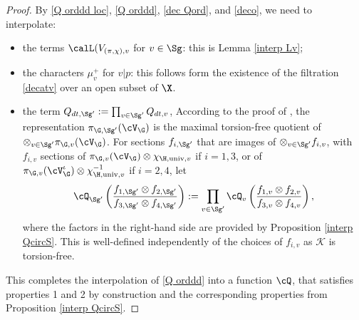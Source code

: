 \begin{proof} By \eqref{Q orddd loc}, \eqref{Q orddd}, \eqref{dec Qord}, and \eqref{deco}, we need to interpolate:
\begin{itemize}
\item the terms $\calL(V_{(\pi, \chi), v}$ for $v\in \Sg$: this is Lemma \ref{interp Lv};
\item the characters $\mu_{v}^{+}$ for $v\vert p$:  this follows form the existence of the filtration  \eqref{decatv} over  an open subset of $\X$.
\item the term $Q_{dt, \Sg'}:=\prod_{v\in \Sg'}Q_{dt, v}$,
 According to the proof of \cite[Theorem 4.4.1]{LLC},
the representation $\pi_{\G, {\Sg'}}(\cV_{\G})$ is the maximal torsion-free quotient of $\otimes_{v\in {\Sg'}}\pi_{\G,v}(\cV_{\G})$.  For  sections $f_{i,{\Sg'}}$ that are  images of $\otimes_{v\in {\Sg'}}f_{i,v}$, with $f_{i,v}$ sections of $ \pi_{\G,v}(\cV_{\G})\otimes\chi_{\H, {\rm univ},v}$ if $i=1,3$, or of  $ \pi_{\G,v}(\cV_{\G}^{\iota})\otimes\chi^{-1}_{\H, {\rm univ},v}$ if $i=2,4$, let
$$\cQ^{}_{{\Sg'}}\left({ f_{1, {\Sg'}}\otimes f_{2, {\Sg'}}\over f_{3, {\Sg'}}\otimes f_{4, {\Sg'}}}\right):=
\prod_{v\in {\Sg'}} \cQ_{v}\left( {f_{1,v}\otimes f_{2,v}\over f_{3,v}\otimes  f_{4,v}}\right),$$
where the factors in the right-hand side are provided by Proposition \ref{interp QcircS}. This is
 well-defined  independently of the choices of $f_{i,v}$ as $\mathscr{K}$ is torsion-free.
\end{itemize}




This completes the interpolation of \eqref{Q orddd} into a function $\cQ$, that satisfies properties 1 and 2 by  construction and the corresponding properties from Proposition \ref{interp QcircS}.
\end{proof}
